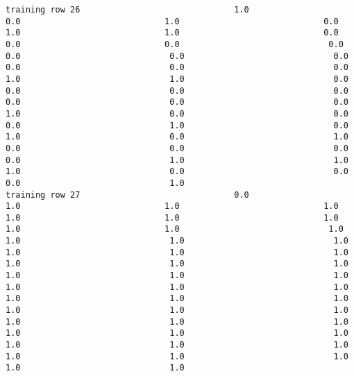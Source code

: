 \documentclass[11pt]{article}
\begin{document}
\begin{verbatim}
training row 26                               1.0                             0.0                             1.0                             0.0                             1.0                             1.0                             0.0                             0.0                             0.0                              0.0                              0.0                              0.0                              0.0                              0.0                              0.0                              0.0                              1.0                              1.0                              0.0                              0.0                              0.0                              0.0                              0.0                              0.0                              0.0                              1.0                              0.0                              0.0                              0.0                              1.0                              0.0                              1.0                              0.0                              1.0                              0.0                              0.0                              0.0                              0.0                              1.0                              1.0                              1.0                              0.0                              0.0                              0.0                              1.0
training row 27                               0.0                             1.0                             1.0                             1.0                             1.0                             1.0                             1.0                             1.0                             1.0                              1.0                              1.0                              1.0                              1.0                              1.0                              1.0                              1.0                              1.0                              1.0                              1.0                              1.0                              1.0                              1.0                              1.0                              1.0                              1.0                              1.0                              1.0                              1.0                              1.0                              1.0                              1.0                              1.0                              1.0                              1.0                              1.0                              1.0                              1.0                              1.0                              1.0                              1.0                              1.0                              1.0                              1.0                              1.0                              1.0

\end{verbatim}
\end{document}
